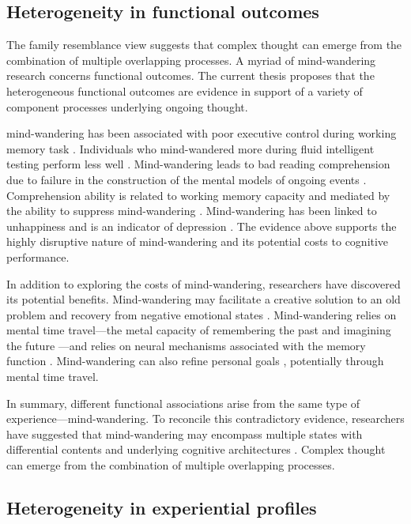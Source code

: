 \subsection{Heterogeneity in functional outcomes}

The family resemblance view suggests that complex thought can emerge from the combination of multiple overlapping processes. A myriad of mind-wandering research concerns functional outcomes. The current thesis proposes that the heterogeneous functional outcomes are evidence in support of a variety of component processes underlying ongoing thought. 

mind-wandering has been associated with poor executive control during working memory task \cite{McVayJOEP2009}. Individuals who mind-wandered more during fluid intelligent testing perform less well \cite{MrazekJoEP2012}. Mind-wandering leads to bad reading comprehension due to failure in the construction of the mental models of ongoing events \cite{Smallwood2008}. Comprehension ability is related to working memory capacity and mediated by the ability to suppress mind-wandering \cite{McVayReading2012, Unsworth2013}. Mind-wandering has been linked to unhappiness \cite{Killingsworth2010} and is an indicator of depression \cite{Smallwood2007}. The evidence above supports the highly disruptive nature of mind-wandering and its potential costs to cognitive performance.

In addition to exploring the costs of mind-wandering, researchers have discovered its potential benefits. Mind-wandering may facilitate a creative solution to an old problem \cite{Baird2012, Smeekens2016} and recovery from negative emotional states \cite{RubyPlos2013, PoerioFrontiers2016}. Mind-wandering relies on mental time travel---the metal capacity of remembering the past and imagining the future \cite{Stawarczyk2015}---and relies on neural mechanisms associated with the memory function \cite{DArgembeau2006,DArgembeau2015}. Mind-wandering can also refine personal goals \cite{Medea2016}, potentially through mental time travel. 

In summary, different functional associations arise from the same type of experience---mind-wandering. To reconcile this contradictory evidence, researchers have suggested that mind-wandering may encompass multiple states with differential contents and underlying cognitive architectures \cite{SmallwoodFrontiers2013}. Complex thought can emerge from the combination of multiple overlapping processes. 

\subsection{Heterogeneity in experiential profiles}


